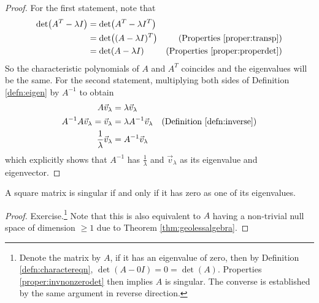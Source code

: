\begin{proof}
For the first statement, note that
\begin{align*}
\det(A^T -\lambda I) &= \det(A^T - \lambda I^T) \\
&= \det((A - \lambda I)^T) & \text{(Properties \ref{proper:transp})} \\
&= \det(A - \lambda I) & \text{(Properties \ref{proper:properdet})}
\end{align*}
So the characteristic polynomials of $A$ and $A^T$ coincides and the eigenvalues will be the same. For the second statement, multiplying both sides of Definition \ref{defn:eigen} by $A^{-1}$ to obtain
\begin{align*}
A\vec{v}_\lambda &= \lambda\vec{v}_\lambda \\
A^{-1}A\vec{v}_\lambda = \vec{v}_\lambda &= \lambda A^{-1}\vec{v}_\lambda & \text{(Definition \ref{defn:inverse})}\\
\frac{1}{\lambda}\vec{v}_\lambda &= A^{-1}\vec{v}_\lambda 
\end{align*}
which explicitly shows that $A^{-1}$ has $\frac{1}{\lambda}$ and $\vec{v}_\lambda$ as its eigenvalue and eigenvector.
\end{proof}
\begin{thm}
A square matrix is singular if and only if it has zero as one of its eigenvalues.
\end{thm}
\begin{proof}
Exercise.\footnote{Denote the matrix by $A$, if it has an eigenvalue of zero, then by Definition \ref{defn:charactereqn}, $\det(A-0I) = 0 = \det(A)$. Properties \ref{proper:invnonzerodet} then implies $A$ is singular. The converse is established by the same argument in reverse direction.} Note that this is also equivalent to $A$ having a non-trivial null space of dimension $\geq 1$ due to Theorem \ref{thm:geolessalgebra}.
\end{proof}

